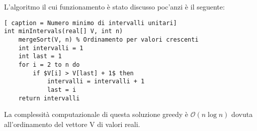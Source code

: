 \documentclass[../cheatSheetAlgoritmi.tex]{subfiles}
\begin{document}
L'algoritmo il cui funzionamento è stato discusso poc'anzi è il seguente:
\begin{lstlisting}[ caption = Numero minimo di intervalli unitari]
int minIntervals(real[] V, int n)
	mergeSort(V, n) % Ordinamento per valori crescenti
	int intervalli = 1
	int last = 1
	for i = 2 to n do
		if $V[i] > V[last] + 1$ then
			intervalli = intervalli + 1
			last = i
	return intervalli
\end{lstlisting}
La complessità computazionale di questa soluzione greedy è $\mathcal{O}(n \log n)$ dovuta all'ordinamento del vettore V di valori reali.
\newpage
\end{document}
